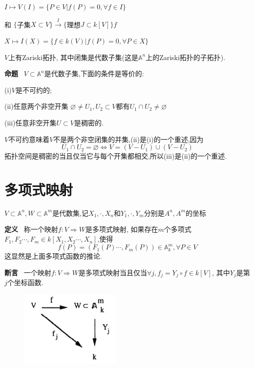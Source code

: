 \documentclass[UTF8]{book}
\begin{document}
			  $ I \longmapsto V(I)=\{P\in V\vert f(P)=0,\forall f \in I \}$

		\justifying
		和
			\center  $\{$子集$X\subset V \}\stackrel{I}{\longrightarrow} \{$理想$J\subset k[V]\}f$


			   $ X \longmapsto I(X)=\{f\in k(V)\vert f(P)=0,\forall P \in X\}$

		\justifying
		$ V $上有Zariski拓扑, 其中闭集是代数子集(这是$\mathbb{A}^{n}$上的Zariski拓扑的子拓扑).

		\textbf{命题} \ $V\subset \mathbb{A}^{n}$是代数子集,下面的条件是等价的:

		(i)$ V $是不可约的;

		(ii)任意两个非空开集 $\varnothing \neq U_{1},U_{2} \subset V $都有$U_{1} \cap U_{2}\neq \varnothing$

		(iii)任意非空开集$U\subset V$是稠密的.

		$ V $不可约意味着$ V $不是两个非空闭集的并集,(ii)是(i)的一个重述,因为
		\begin{equation*}
		U_{1}\cap U_{2}=\varnothing \Longleftrightarrow V=(V-U_{1})\cup (V-U_{2})
		\end{equation*}
		拓扑空间是稠密的当且仅当它与每个开集都相交,所以(iii)是(ii)的一个重述.

	\section{多项式映射} $V\subset \mathbb{A}^{n},W\subset \mathbb{A}^{m}$是代数集,记$X_{1},\cdot,X_{n}$和$Y_{1},\cdot,Y_{m}$分别是$A^{n},A^{m}$的坐标

		\textbf{定义} \ 称一个映射$ f:V \Rightarrow W $是多项式映射, 如果存在$ m $个多项式$F_{1},F_{2}\cdots,F_{m}\in k[X_{1},X_{2}\cdots,X_{n}]$,使得
		\begin{equation*}
		f(P)=(F_{1}(P)\cdots,F_{m}(P)) \in \mathbb{A}^{m}_{k}, \forall  P\in V
		\end{equation*}
		这显然是上面多项式函数的推论.

		\textbf{断言} \ 一个映射$ f:V \Rightarrow W $是多项式映射当且仅当$\forall  j, f_{j}=Y_{j}\circ f \in k[V]$, 其中$Y_{j}$是第$ j $个坐标函数.
		\begin{figure}[h]
		  \centering
		  \includegraphics[width=5cm]{68.jpg}\\
		\end{figure}
\end{document}
